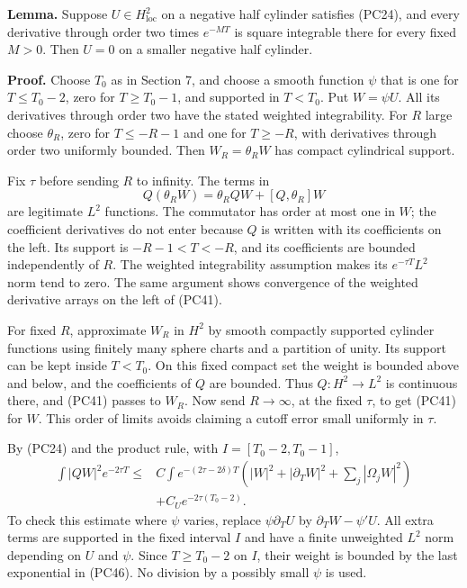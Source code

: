 \documentclass[
  11pt,
]{article}
\begin{document}
\textbf{Lemma.} Suppose \(U\in H^2_{\mathrm{loc}}\) on a negative half
cylinder satisfies (PC24), and every derivative through order two times
\(e^{-MT}\) is square integrable there for every fixed \(M>0\). Then
\(U=0\) on a smaller negative half cylinder.

\textbf{Proof.} Choose \(T_0\) as in Section 7, and choose a smooth
function \(\psi\) that is one for \(T\leq T_0-2\), zero for
\(T\geq T_0-1\), and supported in \(T<T_0\). Put \(W=\psi U\). All its
derivatives through order two have the stated weighted integrability.
For \(R\) large choose \(\theta_R\), zero for \(T\leq-R-1\) and one for
\(T\geq-R\), with derivatives through order two uniformly bounded. Then
\(W_R=\theta_RW\) has compact cylindrical support.

Fix \(\tau\) before sending \(R\) to infinity. The terms in \[
Q(\theta_RW)=\theta_RQW+[Q,\theta_R]W
\tag{PC45}
\] are legitimate \(L^2\) functions. The commutator has order at most
one in \(W\); the coefficient derivatives do not enter because \(Q\) is
written with its coefficients on the left. Its support is \(-R-1<T<-R\),
and its coefficients are bounded independently of \(R\). The weighted
integrability assumption makes its \(e^{-\tau T}L^2\) norm tend to zero.
The same argument shows convergence of the weighted derivative arrays on
the left of (PC41).

For fixed \(R\), approximate \(W_R\) in \(H^2\) by smooth compactly
supported cylinder functions using finitely many sphere charts and a
partition of unity. Its support can be kept inside \(T<T_0\). On this
fixed compact set the weight is bounded above and below, and the
coefficients of \(Q\) are bounded. Thus \(Q:H^2\to L^2\) is continuous
there, and (PC41) passes to \(W_R\). Now send \(R\to\infty\), at the
fixed \(\tau\), to get (PC41) for \(W\). This order of limits avoids
claiming a cutoff error small uniformly in \(\tau\).

By (PC24) and the product rule, with \(I=[T_0-2,T_0-1]\), \[
\begin{split}
\int|QW|^2e^{-2\tau T}
\leq{}&C\int e^{-(2\tau-2\delta)T}
       (|W|^2+|\partial_TW|^2+\sum_j|\Omega_jW|^2)\\
 &+C_Ue^{-2\tau(T_0-2)}.
\end{split}
\tag{PC46}
\] To check this estimate where \(\psi\) varies, replace
\(\psi\partial_TU\) by \(\partial_TW-\psi'U\). All extra terms are
supported in the fixed interval \(I\) and have a finite unweighted
\(L^2\) norm depending on \(U\) and \(\psi\). Since \(T\geq T_0-2\) on
\(I\), their weight is bounded by the last exponential in (PC46). No
division by a possibly small \(\psi\) is used.
\end{document}
